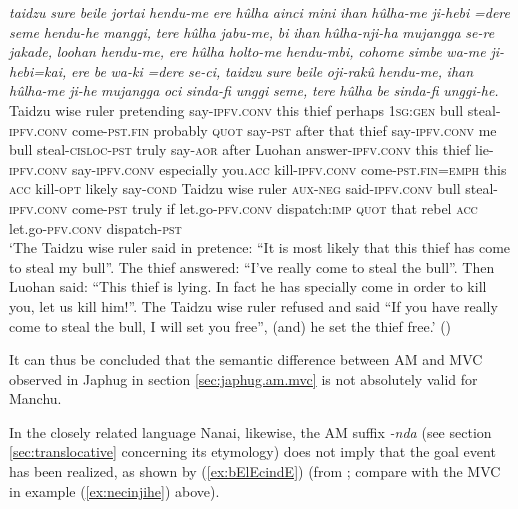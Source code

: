 \documentclass{article}
\newcommand{\ipa}[1]{\textit{{\phon\mbox{#1}}}} %
\begin{document}
\begin{exe}
\ex \label{ex:huulhanjiha}
\gll
\ipa{taidzu} 	\ipa{sure} 	\ipa{beile} 	\ipa{jortai} 	\ipa{hendu-me} 	\ipa{ere} 	\ipa{hûlha} 	\ipa{ainci} 	\ipa{mini} 	\ipa{ihan} 	\ipa{hûlha-me} 	\ipa{ji-hebi} 	\ipa{=dere} 	\ipa{seme} 	\ipa{hendu-he} 	\ipa{manggi,} 	\ipa{tere} 	\ipa{hûlha} 	\ipa{jabu-me,} 	\ipa{bi} 	\ipa{ihan} 	\ipa{hûlha-nji-ha} 	\ipa{mujangga} 	\ipa{se-re} 	\ipa{jakade,} 	\ipa{loohan} 	\ipa{hendu-me,} 	\ipa{ere} 	\ipa{hûlha} 	\ipa{holto-me} 	\ipa{hendu-mbi,} 	\ipa{cohome} 	\ipa{simbe} 	\ipa{wa-me} 	\ipa{ji-hebi=kai,} 	\ipa{ere} 	\ipa{be} 	\ipa{wa-ki} 	\ipa{=dere} 	\ipa{se-ci,} 	\ipa{taidzu} 	\ipa{sure} 	\ipa{beile} 	\ipa{oji-rakû} 	\ipa{hendu-me,} 	\ipa{ihan} 	\ipa{hûlha-me} 	\ipa{ji-he} 	\ipa{mujangga} 	\ipa{oci} 	\ipa{sinda-fi} 	\ipa{unggi} 	\ipa{seme,} 	\ipa{tere} 	\ipa{hûlha} 	\ipa{be} 	\ipa{sinda-fi} 	\ipa{unggi-he.} \\
Taidzu wise ruler pretending say-\textsc{ipfv.conv} this thief perhaps \textsc{1sg:gen} bull steal-\textsc{ipfv.conv} come-\textsc{pst.fin} probably \textsc{quot} say-\textsc{pst} after that thief say-\textsc{ipfv.conv} me bull steal-\textsc{cisloc-pst} truly say-\textsc{aor} after Luohan answer-\textsc{ipfv.conv} this thief lie-\textsc{ipfv.conv} say-\textsc{ipfv.conv} especially you.\textsc{acc} kill-\textsc{ipfv.conv} come-\textsc{pst.fin}=\textsc{emph} this \textsc{acc} kill-\textsc{opt} likely say-\textsc{cond} Taidzu wise ruler \textsc{aux-neg} said-\textsc{ipfv.conv} bull steal-\textsc{ipfv.conv} come-\textsc{pst} truly if let.go-\textsc{pfv.conv} dispatch:\textsc{imp} \textsc{quot} that rebel \textsc{acc} let.go-\textsc{pfv.conv} dispatch-\textsc{pst} \\
\glt  `The Taidzu wise ruler said in pretence: “It is most likely that this thief has come to steal my bull”. The thief answered: “I’ve really come to steal the bull”. Then Luohan said: “This thief is lying. In fact he has specially come in order to kill you, let us kill him!”. The Taidzu wise ruler refused and said “If you have really come to steal the bull, I will set you free”, (and) he set the thief free.' (\citealt[35;171-172]{shunjuu92yargiyan})
\end{exe}


It can thus be concluded that the semantic difference between AM and MVC observed in Japhug in section \ref{sec:japhug.am.mvc} is not absolutely valid for Manchu.

In the closely related language Nanai, likewise, the AM suffix  \ipa{-nda} (see section \ref{sec:translocative} concerning its etymology) does not imply that the goal event has been realized, as shown by (\ref{ex:bElEcindE}) (from \citealt[89]{stojnova16nda}; compare with the MVC in example (\ref{ex:necinjihe}) above).
\end{document}
